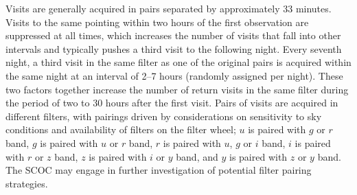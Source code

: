 \hangindent=0.7cm Visits are generally acquired in pairs separated by approximately 33 minutes. Visits to the same pointing within two hours of the first observation are suppressed at all times, which increases the number of visits that fall into other intervals  and typically pushes a third visit to the following night. Every seventh night, a third visit in the same filter as one of the original pairs is acquired within the same night at an interval of 2--7 hours (randomly assigned per night). These two factors together increase the number of return visits in the same filter during the period of two to 30 hours after the first visit.
Pairs of visits are acquired in different filters, with pairings driven by considerations on sensitivity to sky conditions and availability of filters on the filter wheel; $u$ is paired with $g$ or $r$ band, $g$ is paired with $u$ or $r$ band, $r$ is paired with $u$, $g$ or $i$ band, $i$ is paired with $r$ or $z$ band, $z$ is paired with $i$ or $y$ band, and $y$ is paired with $z$ or $y$ band. The SCOC may engage in further investigation of potential filter pairing strategies. 
